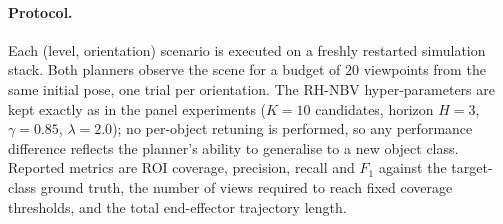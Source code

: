 \paragraph{Protocol.} Each (level, orientation) scenario is executed on a
freshly restarted simulation stack. Both planners observe the scene for a
budget of $20$ viewpoints from the same initial pose, one trial per
orientation. The RH-NBV hyper-parameters are kept exactly as in the panel
experiments ($K = 10$ candidates, horizon $H = 3$, $\gamma = 0.85$,
$\lambda = 2.0$); no per-object retuning is performed, so any performance
difference reflects the planner's ability to generalise to a new object
class. Reported metrics are ROI coverage, precision, recall and $F_1$ against
the target-class ground truth, the number of views required to reach fixed
coverage thresholds, and the total end-effector trajectory length.
